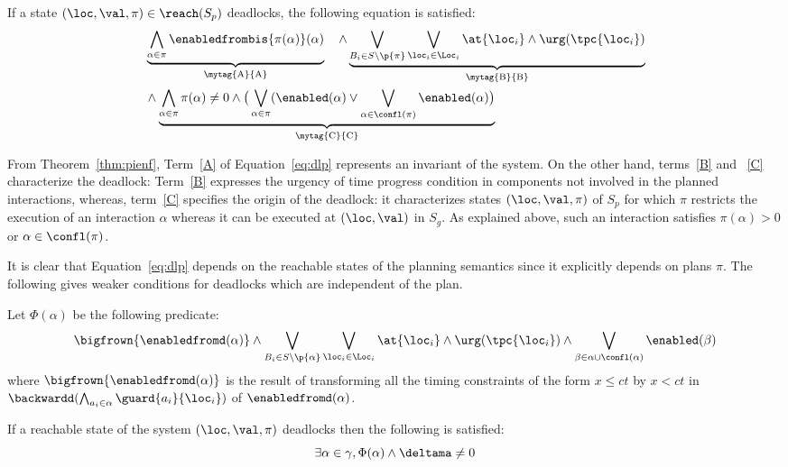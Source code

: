   \begin{theorem}\label{thm:dlp}
    If a state $(\loc,\val,\pi)\in\reach(S_p)$ deadlocks, the following equation is satisfied:
  \begin{equation}\label{eq:dlp}
  \begin{split}
    &\underbrace{\bigwedge_{\alpha\in\pi}\enabledfrombis{\pi(\alpha)}(\alpha)}_\text{\mytag{A}{A}}\quad\wedge
    \underbrace{\bigvee_{B_i\in S\setminus\p{\pi}}\bigvee_{\loc_i\in\Loc_i} \at{\loc_i} \wedge \urg(\tpc{\loc_i})}_\text{\mytag{B}{B}}\\
    &\wedge\underbrace{\bigwedge_{\alpha\in\pi}\pi(\alpha)\neq 0\wedge\big(\bigvee_{\alpha\in\pi}(\enabled(\alpha)\vee
    \bigvee_{\alpha\in\confl(\pi)}\enabled(\alpha)\big)}_\text{\mytag{C}{C}}
  \end{split}
  \end{equation}
  \end{theorem}
  From Theorem~\ref{thm:pienf}, Term~\ref{A} of Equation~\ref{eq:dlp} represents an invariant of the system. On the other hand, terms~\ref{B} and
  ~\ref{C} characterize the deadlock: Term~\ref{B} expresses the urgency of time progress condition in components not involved in the planned interactions, 
  whereas, term~\ref{C} specifies the origin of the deadlock: it characterizes states $(\loc,\val,\pi)$ of $S_p$ for which $\pi$ restricts the execution of an 
  interaction $\alpha$ whereas it can be executed at $(\loc,\val)$ in $S_g$.
  As explained above, such an interaction satisfies $\pi(\alpha) > 0$ or $\alpha \in \confl(\pi)$.
  
  It is clear that Equation~\ref{eq:dlp} depends on the reachable states of the planning semantics since it explicitly depends on plans $\pi$.
  The following gives weaker conditions for deadlocks which are independent of the plan. 
  \begin{theorem}\label{thm:phi}
    Let $\Phi(\alpha)$ be the following predicate:
    \begin{equation}\label{eq:phi}
      \bigfrown{\enabledfromd(\alpha)}\wedge
      \bigvee_{B_i\in S\setminus\p{\alpha}}\bigvee_{\loc_i\in\Loc_i}\at{\loc_i}\wedge\urg(\tpc{\loc_i})
    \wedge\bigvee_{\beta\in\alpha\cup\confl(\alpha)}\enabled(\beta)
  \end{equation}
  where $\bigfrown{\enabledfromd(\alpha)}$ is the result of transforming all the timing constraints of the form $x\le ct$ by $x<ct$
  in $\backwardd(\bigwedge_{a_i\in\alpha}\guard{a_i}{\loc_i})$ of $\enabledfromd(\alpha)$.
  
  If a reachable state of the system $(\loc,\val,\pi)$ deadlocks then the following is satisfied:
  \begin{equation}\label{eq:dlpf}
      \exists\alpha\in\gamma, \Phi(\alpha)\wedge\deltama\neq0
  \end{equation}
  \end{theorem}
 
